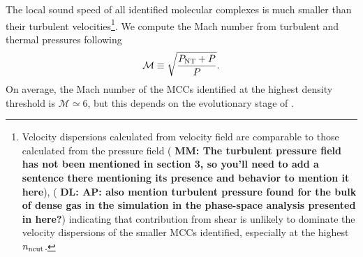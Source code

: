 \IfFileExists{emulateapjlegacy.cls}{\documentclass[iop]{emulateapjlegacy}}{\documentclass[iop]{emulateapj}}
\newcommand{\DL}[1]{({\bf \color{dlcolor} DL: #1})}
\newcommand{\MM}[1]{({\bf \color{mmcolor} MM: #1})}
\begin{document}
The local sound speed of all identified molecular complexes is much
smaller than their turbulent velocities\footnote{Velocity dispersions
  calculated from velocity field are comparable to those calculated
  from the pressure field 
    \MM{The turbulent pressure field has not been
    mentioned in section 3, so you'll need to add a sentence there
    mentioning its presence and behavior to mention it here}, 
    \DL{AP: also mention turbulent pressure found for the bulk of dense gas in the simulation in the phase-space analysis presented in \citet{Pallottini17a} here?}
indicating that contribution from shear is unlikely to dominate the velocity dispersions of the smaller MCCs identified, especially 
at the highest $n_{\rm ncut}$.\label{ftn:veldisp}}. 
We compute the Mach number from turbulent and thermal pressures following
\begin{equation}
\mathcal{M} \equiv \sqrt{\frac{P_{\rm NT} + P}{ P }}.
\label{eqn:MPress}
\end{equation}
On average, the Mach number of the MCCs identified at the highest density threshold is $\mathcal{M} \simeq6$,
but this depends on the evolutionary stage of \flower.  %
\end{document}
